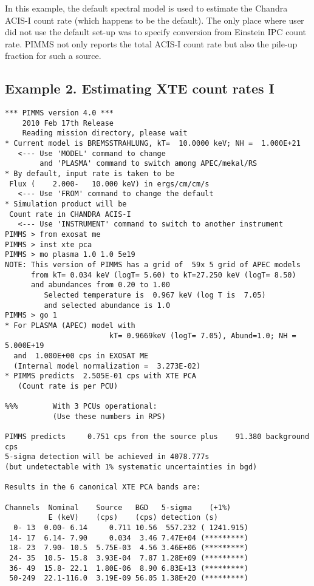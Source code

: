 In this example, the default spectral model is used to estimate
the Chandra ACIS-I count rate (which happens to be the default). 
The only place where user did not use the default set-up was to specify
conversion from Einstein IPC count rate.  PIMMS not only reports
the total ACIS-I count rate but also the pile-up fraction for such
a source.

\subsection*{Example 2. Estimating XTE count rates I}

\begin{verbatim}
*** PIMMS version 4.0 ***
    2010 Feb 17th Release
    Reading mission directory, please wait
* Current model is BREMSSTRAHLUNG, kT=  10.0000 keV; NH =  1.000E+21
   <--- Use 'MODEL' command to change
        and 'PLASMA' command to switch among APEC/mekal/RS
* By default, input rate is taken to be
 Flux (    2.000-   10.000 keV) in ergs/cm/cm/s
   <--- Use 'FROM' command to change the default
* Simulation product will be
 Count rate in CHANDRA ACIS-I
   <--- Use 'INSTRUMENT' command to switch to another instrument
PIMMS > from exosat me
PIMMS > inst xte pca
PIMMS > mo plasma 1.0 1.0 5e19
NOTE: This version of PIMMS has a grid of  59x 5 grid of APEC models
      from kT= 0.034 keV (logT= 5.60) to kT=27.250 keV (logT= 8.50)
      and abundances from 0.20 to 1.00
         Selected temperature is  0.967 keV (log T is  7.05)
         and selected abundance is 1.0
PIMMS > go 1
* For PLASMA (APEC) model with
                        kT= 0.9669keV (logT= 7.05), Abund=1.0; NH =  5.000E+19
  and  1.000E+00 cps in EXOSAT ME
  (Internal model normalization =  3.273E-02)
* PIMMS predicts  2.505E-01 cps with XTE PCA
   (Count rate is per PCU)

%%%        With 3 PCUs operational:
           (Use these numbers in RPS)

PIMMS predicts     0.751 cps from the source plus    91.380 background cps
5-sigma detection will be achieved in 4078.777s
(but undetectable with 1% systematic uncertainties in bgd)

Results in the 6 canonical XTE PCA bands are:

Channels  Nominal    Source   BGD   5-sigma    (+1%)
          E (keV)    (cps)    (cps) detection (s)
  0- 13  0.00- 6.14     0.711 10.56  557.232 ( 1241.915)
 14- 17  6.14- 7.90     0.034  3.46 7.47E+04 (*********)
 18- 23  7.90- 10.5  5.75E-03  4.56 3.46E+06 (*********)
 24- 35  10.5- 15.8  3.93E-04  7.87 1.28E+09 (*********)
 36- 49  15.8- 22.1  1.80E-06  8.90 6.83E+13 (*********)
 50-249  22.1-116.0  3.19E-09 56.05 1.38E+20 (*********)


\end{verbatim}
